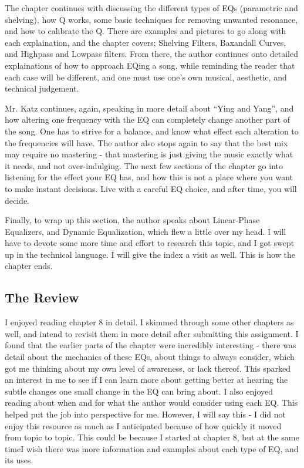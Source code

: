 \documentclass{article}
\begin{document}
\medskip

The chapter continues with discussing the different types of EQs (parametric and shelving), how Q works, some basic techniques for removing unwanted resonance, and how to calibrate the Q. There are examples and pictures to go along with each explaination, and the chapter covers; Shelving Filters, Baxandall Curves, and Highpass and Lowpass filters. From there, the author continues onto detailed explainations of how to approach EQing a song, while reminding the reader that each case will be different, and one must use one's own musical, aesthetic, and technical judgement.

\medskip

Mr. Katz continues, again, speaking in more detail about ``Ying and Yang'', and how altering one frequency with the EQ can completely change another part of the song. One has to strive for a balance, and know what effect each alteration to the frequencies will have. The author also stops again to say that the best mix may require no mastering - that mastering is just giving the music exactly what it needs, and not over-indulging. The next few sections of the chapter go into listening for the effect your EQ has, and how this is not a place where you want to make instant decisions. Live with a careful EQ choice, and after time, you will decide.

\medskip

Finally, to wrap up this section, the author speaks about Linear-Phase Equalizers, and Dynamic Equalization, which flew a little over my head. I will have to devote some more time and effort to research this topic, and I got swept up in the technical language. I will give the index a visit as well. This is how the chapter ends.

\pagebreak

\subsection{The Review}

I enjoyed reading chapter 8 in detail. I skimmed through some other chapters as well, and intend to revisit them in more detail after submitting this assignment. I found that the earlier parts of the chapter were incredibly interesting - there was detail about the mechanics of these EQs, about things to always consider, which got me thinking about my own level of awareness, or lack thereof. This sparked an interest in me to see if I can learn more about getting better at hearing the subtle changes one small change in the EQ can bring about. I also enjoyed reading about when and for what the author would consider using each EQ. This helped put the job into perspective for me. However, I will say this - I did not enjoy this resource as much as I anticipated because of how quickly it moved from topic to topic. This could be because I started at chapter 8, but at the same timeI wish there was more information and examples about each type of EQ, and its uses.
\end{document}
